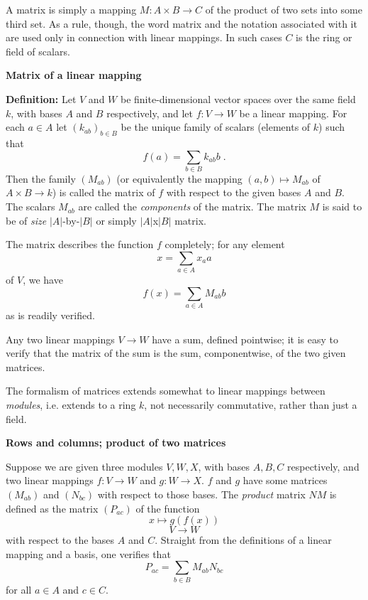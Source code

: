 \documentclass[12pt]{article}
\newcommand*{\abs}[1]{\lvert #1\rvert}
\begin{document}
 
 
 
 

A matrix is simply a mapping $M\colon A\times B\to C$ of the product of two
sets into some third set.
As a rule, though, the word matrix and the notation associated with it
are used only in connection with linear mappings.
In such cases $C$ is the ring or field of scalars.

\textbf{Matrix of a linear mapping}

\textbf{Definition: }Let $V$ and $W$ be finite-dimensional vector
spaces over the same field $k$, with bases $A$ and $B$ respectively,
and let $f\colon V\to W$ be a linear mapping.
For each $a\in A$ let $(k_{ab})_{b\in B}$ be the unique family of scalars
(elements of $k$) such that
$$f(a)=\sum_{b\in B}k_{ab}b\;.$$
Then the family $(M_{ab})$ (or equivalently the mapping $(a,b)\mapsto M_{ab}$
of $A\times B\to k$)
is called the matrix of $f$ with respect to the given bases $A$ and $B$.
The scalars $M_{ab}$ are called the \emph{components} of the matrix. The matrix $M$ is said to be of \emph{size} $\abs{A}$-by-$\abs{B}$ or simply $\abs{A}$x$\abs{B}$ matrix.

The matrix describes the function $f$ completely; for any element
$$x=\sum_{a\in A}x_aa$$
of $V$, we have
$$f(x)=\sum_{a\in A}M_{ab}b$$
as is readily verified.

Any two linear mappings $V\to W$ have a sum, defined pointwise; it
is easy to verify that the matrix of the sum is the sum, componentwise,
of the two given matrices.

The formalism of matrices extends somewhat to linear mappings between
\emph{modules}, i.e. extends to a ring $k$, not necessarily commutative,
rather than just a field.

\textbf{Rows and columns; product of two matrices}

Suppose we are given three modules $V,W,X$, with bases $A,B,C$ respectively,
and two linear mappings $f\colon V\to W$ and $g\colon W\to X$.
$f$ and $g$ have some matrices $(M_{ab})$ and $(N_{bc})$ with respect to
those bases. The \emph{product} matrix $NM$ is defined as the matrix
$(P_{ac})$ of the function
$$x\mapsto g(f(x))$$
$$V\to W$$
with respect to the bases $A$ and $C$. Straight from the definitions
of a linear mapping and a basis, one verifies that
\begin{equation} \label{eq:prodcomp}
P_{ac}=\sum_{b\in B}M_{ab}N_{bc}
\end{equation}
for all $a\in A$ and $c\in C$.
\end{document}
